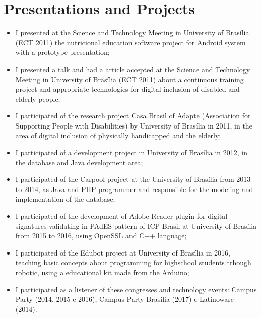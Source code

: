 \section{Presentations and Projects}

\begin{itemize}
    \item I presented at the Science and Technology Meeting in University of Brasília (ECT 2011) the nutricional education software project for Android system with a prototype presentation;
    \item I presented a talk and had a article accepted at the Science and Technology Meeting in University of Brasília (ECT 2011) about a continuous training project and appropriate technologies for digital inclusion of disabled and elderly people; 
    \item I participated of the research project Casa Brasil of Adapte (Association for Supporting People with Disabilities) by University of Brasília in 2011, in the area of digital inclusion of physically handicapped and the elderly;
    \item I participated of a development project in University of Brasília in 2012, in the database and Java development area;
    \item I participated of the Carpool project at the University of Brasília from 2013 to 2014, as Java and PHP programmer and responsible for the modeling and implementation of the database;
    \item I participated of the development of Adobe Reader plugin for digital signatures validating in PAdES pattern of ICP-Brasil at University of Brasília from 2015 to 2016, using OpenSSL and C++ language;
    \item I participated of the Edubot project at University of Brasília in 2016, teaching basic concepts about programming for highschool students trhough robotic, using a educational kit made from the Arduino;
    \item I participated as a listener of these congresses and technology events: Campus Party (2014, 2015 e 2016), Campus Party Brasília (2017) e Latinoware (2014).
\end{itemize}